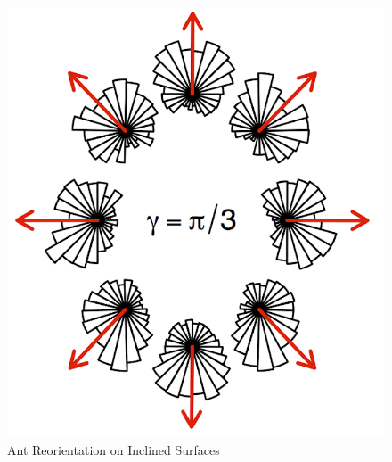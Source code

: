 \begin{figure}[h]
\begin{minipage}[]{0.3\textwidth}
\end{minipage}%
\begin{minipage}[]{0.05\textwidth}
~
\end{minipage}%
\begin{minipage}[]{0.3\textwidth}
    \includegraphics[width=\textwidth]{img/khuong_pi_div_3}
\end{minipage}%
\caption{Ant Reorientation on Inclined Surfaces \scriptsize{\cite{khuong_how_2013}}}
\end{figure}
